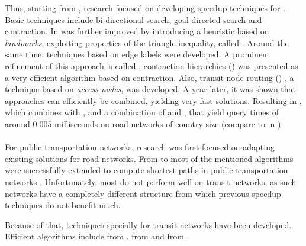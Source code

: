 	Thus, starting from , research focused on developing speedup techniques for \dijkstra. Basic techniques include
	bi-directional search, goal-directed search and contraction. In  \astar was further
	improved by introducing a heuristic based on \textit{landmarks}, exploiting properties of the triangle inequality,
	called \alt {}. Around the same time, techniques based on edge labels were developed. A prominent refinement of this
	approach is called \arcFlags {}.  contraction hierarchies (\ch)  was presented as a
	very efficient algorithm based on contraction. Also, transit node routing (\tnr) , a technique based on \textit{access nodes},
	was developed. A year later, it was shown that approaches can efficiently be combined, yielding very fast solutions.
	Resulting in \chase {}, which combines \ch with \arcFlags, and a combination of \tnr and \arcFlags, that yield query times
	of around $0.005$ milliseconds on road networks of country size (compare to 
	in ).\\\\
	For public transportation networks, research was first focused on adapting existing solutions for road networks.
	From  to  most of the mentioned algorithms were successfully extended to compute shortest
	paths in public transportation networks .
	Unfortunately, most do not perform well on transit networks, as such networks have a completely different structure from which
	previous speedup techniques do not benefit much.
	
	Because of that, techniques specially for transit networks have been developed. Efficient algorithms include \transferPatterns
	 from , \raptor {} from  and \csa {} from .


